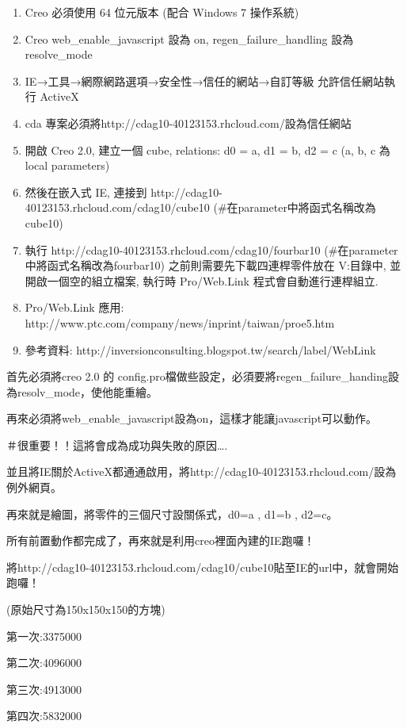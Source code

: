 \documentclass[]{article}
\begin{document}
\begin{enumerate}
\def\labelenumi{\arabic{enumi}.}
\itemsep1pt\parskip0pt
\item
  Creo 必須使用 64 位元版本 (配合 Windows 7 操作系統)
\item
  Creo web\_enable\_javascript 設為 on, regen\_failure\_handling 設為
  resolve\_mode
\item
  IE→工具→網際網路選項→安全性→信任的網站→自訂等級 允許信任網站執行
  ActiveX
\item
  cda 專案必須將http://cdag10-40123153.rhcloud.com/設為信任網站
\item
  開啟 Creo 2.0, 建立一個 cube, relations: d0 = a, d1 = b, d2 = c (a, b,
  c 為 local parameters)
\item
  然後在嵌入式 IE, 連接到
  http://cdag10-40123153.rhcloud.com/cdag10/cube10
  (\#在parameter中將函式名稱改為cube10)
\item
  執行 http://cdag10-40123153.rhcloud.com/cdag10/fourbar10
  (\#在parameter中將函式名稱改為fourbar10)
  之前則需要先下載四連桿零件放在 V:\home\fourbar 目錄中,
  並開啟一個空的組立檔案, 執行時 Pro/Web.Link 程式會自動進行連桿組立.
\item
  Pro/Web.Link 應用:
  http://www.ptc.com/company/news/inprint/taiwan/proe5.htm
\item
  參考資料: http://inversionconsulting.blogspot.tw/search/label/WebLink
\end{enumerate}

首先必須將creo 2.0 的
config.pro檔做些設定，必須要將regen\_failure\_handing設為resolv\_mode，使他能重繪。

再來必須將web\_enable\_javascript設為on，這樣才能讓javascript可以動作。

＃很重要！！這將會成為成功與失敗的原因\ldots{}.

並且將IE關於ActiveX都通通啟用，將http://cdag10-40123153.rhcloud.com/設為例外網頁。

再來就是繪圖，將零件的三個尺寸設關係式，d0=a , d1=b , d2=c。

所有前置動作都完成了，再來就是利用creo裡面內建的IE跑囉！

將http://cdag10-40123153.rhcloud.com/cdag10/cube10貼至IE的url中，就會開始跑囉！

(原始尺寸為150x150x150的方塊)

第一次:3375000

第二次:4096000

第三次:4913000

第四次:5832000
\end{document}
